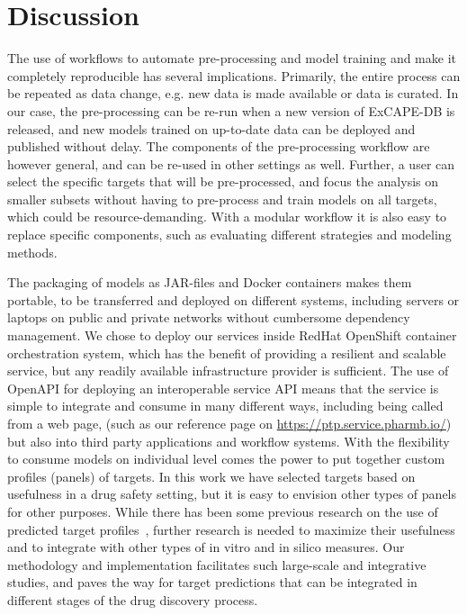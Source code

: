 \documentclass[10pt,article]{memoir}
\begin{document}
\section*{Discussion}
The use of workflows to automate pre-processing and model training and make it
completely reproducible has several implications. Primarily, the entire process
can be repeated as data change, e.g. new data is made available or data is
curated. In our case, the pre-processing can be re-run when a new version of
ExCAPE-DB is released, and new models trained on up-to-date data can be
deployed and published without delay. The components of the pre-processing
workflow are however general, and can be re-used in other settings as well.
Further, a user can select the specific targets that will be pre-processed, and
focus the analysis on smaller subsets without having to pre-process and train
models on all targets, which could be resource-demanding. With a modular
workflow it is also easy to replace specific components, such as evaluating
different strategies and modeling methods.

The packaging of models as JAR-files and Docker containers makes them portable, to be
transferred and deployed on different systems, including servers or laptops on
public and private networks without cumbersome dependency management. We chose
to deploy our services inside RedHat OpenShift container orchestration system,
which has the benefit of providing a resilient and scalable service, but any
readily available infrastructure provider is sufficient. The use of OpenAPI for
deploying an interoperable service API means that the service is simple to
integrate and consume in many different ways, including being called from a web
page, (such as our reference page on \url{https://ptp.service.pharmb.io/})
but also into third party applications and workflow systems. With the
flexibility to consume models on individual level comes the power to put
together custom profiles (panels) of targets. In this work we have selected
targets based on usefulness in a drug safety setting, but it is easy to
envision other types of panels for other purposes. While there has been some
previous research on the use of predicted target
profiles~\cite{Awale:2017is,Yao:2016ij}, further research is needed to maximize
their usefulness and to integrate with other types of in vitro and in silico
measures. Our methodology and implementation facilitates such large-scale and
integrative studies, and paves the way for target predictions that can be
integrated in different stages of the drug discovery process.
\end{document}
